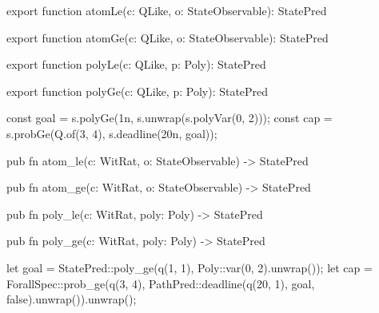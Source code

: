 \begin{tssrc}
export function atomLe(c: QLike, o: StateObservable): StatePred

export function atomGe(c: QLike, o: StateObservable): StatePred

export function polyLe(c: QLike, p: Poly): StatePred

export function polyGe(c: QLike, p: Poly): StatePred
\end{tssrc}
\begin{tssrc}
const goal = s.polyGe(1n, s.unwrap(s.polyVar(0, 2)));
const cap = s.probGe(Q.of(3, 4), s.deadline(20n, goal));
\end{tssrc}
\begin{rustsrc}
pub fn atom_le(c: WitRat, o: StateObservable) -> StatePred

pub fn atom_ge(c: WitRat, o: StateObservable) -> StatePred

pub fn poly_le(c: WitRat, poly: Poly) -> StatePred

pub fn poly_ge(c: WitRat, poly: Poly) -> StatePred
\end{rustsrc}
\begin{rustsrc}
let goal = StatePred::poly_ge(q(1, 1), Poly::var(0, 2).unwrap());
let cap =
    ForallSpec::prob_ge(q(3, 4), PathPred::deadline(q(20, 1), goal, false).unwrap()).unwrap();
\end{rustsrc}
